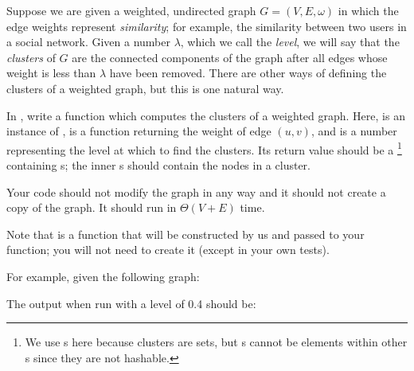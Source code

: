 \begin{progprob}
    Suppose we are given a weighted, undirected graph $G = (V, E, \omega)$ in
    which the edge weights represent \emph{similarity}; for example, the
    similarity between two users in a social network. Given a number $\lambda$, which we call the \emph{level},
    we will say that the \emph{clusters} of $G$ are the connected components of
    the graph after all edges whose weight is less than $\lambda$ have been
    removed. There are other ways of defining the clusters of a weighted graph,
    but this is one natural way.

    In , write a function  which computes the clusters of a weighted graph. Here,
     is an instance of ,
     is a function returning the weight of edge $(u, v)$,
    and  is a number representing the level at which to find the
    clusters. Its return value should be a \footnote{
        We use s here because clusters are sets, but s
        cannot be elements within other s since they are not hashable.
    }
    containing s;
    the inner s should contain the nodes in a cluster.

    Your code should not modify the graph in any way and it should not create a copy
    of the graph. It should run in $\Theta(V + E)$ time.

    Note that  is a function that will be constructed by us and
    passed to your function; you will not need to create it (except in your own
    tests).

    For example, given the following graph:


    The output when run with a level of 0.4 should be:


\end{progprob}
